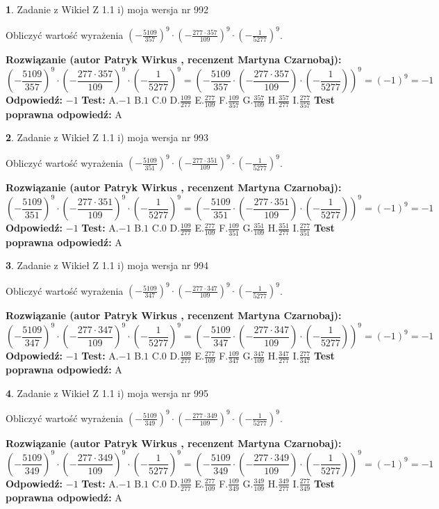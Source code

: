 \documentclass[12pt, a4paper]{article}
\theoremstyle{definition} %
\newtheorem{zad}{}
\newcommand{\zadStart}[1]{\begin{zad}#1\newline}
\newcommand{\zadStop}{\end{zad}}
\newcommand{\rozwStart}[2]{\noindent \textbf{Rozwiązanie (autor #1 , recenzent #2): }\newline}
\newcommand{\rozwStop}{\newline}
\newcommand{\odpStart}{\noindent \textbf{Odpowiedź:}\newline}
\newcommand{\odpStop}{\newline}
\newcommand{\testStart}{\noindent \textbf{Test:}\newline}
\newcommand{\testStop}{\newline}
\newcommand{\kluczStart}{\noindent \textbf{Test poprawna odpowiedź:}\newline}
\newcommand{\kluczStop}{\newline}
\begin{document}
\zadStart{Zadanie z Wikieł Z 1.1 i) moja wersja nr 992}

Obliczyć wartość wyrażenia $(-\frac{5109}{357})^{9} \cdot (-\frac{277 \cdot 357}{109})^{9} \cdot (-\frac{1}{5277})^{9}$.
\zadStop
\rozwStart{Patryk Wirkus}{Martyna Czarnobaj}
$$(-\frac{5109}{357})^{9} \cdot (-\frac{277 \cdot 357}{109})^{9} \cdot (-\frac{1}{5277})^{9} = (-\frac{5109}{357} \cdot (-\frac{277 \cdot 357}{109}) \cdot (-\frac{1}{5277}))^{9} = (-1)^{9} = -1$$
\rozwStop
\odpStart
$-1$
\odpStop
\testStart
A.$-1$ B.$1$ C.$0$ D.$\frac{109}{277}$ E.$\frac{277}{109}$
F.$\frac{109}{357}$ G.$\frac{357}{109}$
H.$\frac{357}{277}$
I.$\frac{277}{357}$
\testStop
\kluczStart
A
\kluczStop



\zadStart{Zadanie z Wikieł Z 1.1 i) moja wersja nr 993}

Obliczyć wartość wyrażenia $(-\frac{5109}{351})^{9} \cdot (-\frac{277 \cdot 351}{109})^{9} \cdot (-\frac{1}{5277})^{9}$.
\zadStop
\rozwStart{Patryk Wirkus}{Martyna Czarnobaj}
$$(-\frac{5109}{351})^{9} \cdot (-\frac{277 \cdot 351}{109})^{9} \cdot (-\frac{1}{5277})^{9} = (-\frac{5109}{351} \cdot (-\frac{277 \cdot 351}{109}) \cdot (-\frac{1}{5277}))^{9} = (-1)^{9} = -1$$
\rozwStop
\odpStart
$-1$
\odpStop
\testStart
A.$-1$ B.$1$ C.$0$ D.$\frac{109}{277}$ E.$\frac{277}{109}$
F.$\frac{109}{351}$ G.$\frac{351}{109}$
H.$\frac{351}{277}$
I.$\frac{277}{351}$
\testStop
\kluczStart
A
\kluczStop



\zadStart{Zadanie z Wikieł Z 1.1 i) moja wersja nr 994}

Obliczyć wartość wyrażenia $(-\frac{5109}{347})^{9} \cdot (-\frac{277 \cdot 347}{109})^{9} \cdot (-\frac{1}{5277})^{9}$.
\zadStop
\rozwStart{Patryk Wirkus}{Martyna Czarnobaj}
$$(-\frac{5109}{347})^{9} \cdot (-\frac{277 \cdot 347}{109})^{9} \cdot (-\frac{1}{5277})^{9} = (-\frac{5109}{347} \cdot (-\frac{277 \cdot 347}{109}) \cdot (-\frac{1}{5277}))^{9} = (-1)^{9} = -1$$
\rozwStop
\odpStart
$-1$
\odpStop
\testStart
A.$-1$ B.$1$ C.$0$ D.$\frac{109}{277}$ E.$\frac{277}{109}$
F.$\frac{109}{347}$ G.$\frac{347}{109}$
H.$\frac{347}{277}$
I.$\frac{277}{347}$
\testStop
\kluczStart
A
\kluczStop



\zadStart{Zadanie z Wikieł Z 1.1 i) moja wersja nr 995}

Obliczyć wartość wyrażenia $(-\frac{5109}{349})^{9} \cdot (-\frac{277 \cdot 349}{109})^{9} \cdot (-\frac{1}{5277})^{9}$.
\zadStop
\rozwStart{Patryk Wirkus}{Martyna Czarnobaj}
$$(-\frac{5109}{349})^{9} \cdot (-\frac{277 \cdot 349}{109})^{9} \cdot (-\frac{1}{5277})^{9} = (-\frac{5109}{349} \cdot (-\frac{277 \cdot 349}{109}) \cdot (-\frac{1}{5277}))^{9} = (-1)^{9} = -1$$
\rozwStop
\odpStart
$-1$
\odpStop
\testStart
A.$-1$ B.$1$ C.$0$ D.$\frac{109}{277}$ E.$\frac{277}{109}$
F.$\frac{109}{349}$ G.$\frac{349}{109}$
H.$\frac{349}{277}$
I.$\frac{277}{349}$
\testStop
\kluczStart
A
\kluczStop
\end{document}

